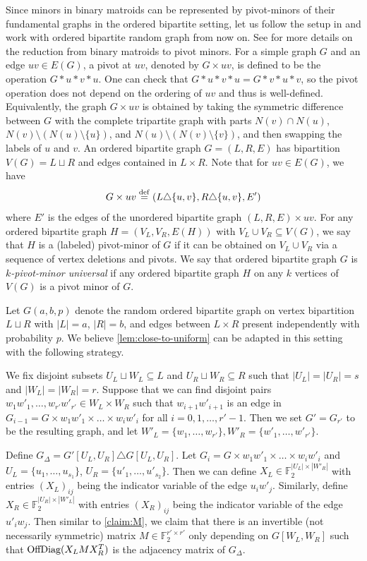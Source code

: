 \documentclass[reqno]{amsart}
\theoremstyle{definition}
\numberwithin{theorem}{section}
\def\eqdef{\overset{\rm{def}}{=}}
\newcommand{\F}{\mathbb{F}}
\newcommand{\OffDiag}{\textup{OffDiag}}
\begin{document}
Since minors in binary matroids can be represented by pivot-minors of their fundamental graphs in the ordered bipartite setting, let us follow the setup in \cite[Section 4]{AFFMP26} and work with ordered bipartite random graph from now on. See \cite{AFFMP26} for more details on the reduction from binary matroids to pivot minors. For a simple graph $G$ and an edge $uv\in E(G)$, a pivot at $uv$, denoted by $G\times uv$, is defined to be the operation $G*u*v*u$. One can check that $G *u*v*u = G*v*u*v$, so the pivot operation does not depend on the ordering of $uv$ and thus is well-defined. Equivalently, the graph $G\times uv$ is obtained by taking the symmetric difference between $G$ with the complete tripartite graph with parts $N(v)\cap N(u)$, $N(v)\setminus (N(u)\setminus \{u\})$, and $N(u)\setminus (N(v)\setminus \{v\})$, and then swapping the labels of $u$ and $v$. An ordered bipartite graph $G = (L, R, E)$ has bipartition $V(G) = L\sqcup R$ and edges contained in $L\times R$. Note that for $uv\in E(G)$, we have 
\[G\times uv \eqdef (L\triangle \{u,v\}, R \triangle \{u,v\}, E') \]
where $E'$ is the edges of the unordered bipartite graph $(L,R,E)\times uv$. For any ordered bipartite graph $H = (V_L,V_R,E(H))$ with $V_L\cup V_R\subseteq V(G)$, we say that $H$ is a (labeled) pivot-minor of $G$ if it can be obtained on $V_L\cup V_R$ via a sequence of vertex deletions and pivots. We say that ordered bipartite graph $G$ is \emph{$k$-pivot-minor universal} if any ordered bipartite graph $H$ on any $k$ vertices of $V(G)$ is a pivot minor of $G$.

Let $G(a, b,p)$ denote the random ordered bipartite graph on vertex bipartition $L\sqcup R$ with $|L| = a$, $|R| = b$, and edges between $L\times R$ present independently with probability $p$. We believe \cref{lem:close-to-uniform} can be adapted in this setting with the following strategy. 

We fix disjoint subsets $U_L\sqcup W_L\subseteq L$ and $U_R\sqcup W_R\subseteq R$ such that $|U_L| = |U_R|=s$ and $|W_L| =|W_R| = r$. 
Suppose that we can find disjoint pairs $w_1w'_1,\dots,w_{r'}w'_{r'}\in W_L\times W_R$ such that $w_{i+1}w'_{i+1}$ is an edge in $G_{i-1}=G\times w_1w'_1\times\dots\times w_{i}w'_{i}$ for all $i=0,1,\dots,r'-1$. Then we set $G'=G_{r'}$ to be the resulting graph, and let $W'_L=\{w_1,\dots,w_{r'}\}, W'_R=\{w'_1,\dots,w'_{r'}\}$.


Define $G_\Delta = G'[U_L,U_R]\triangle G[U_L,U_R]$. Let $G_i = G\times w_1w'_1\times \dots \times w_iw'_i$ and $U_L = \{u_1,\dots, u_{s_1}\}$, $U_R = \{u'_1,\dots, u'_{s_2}\}$. Then we can define $X_L\in \F_2^{|U_L|\times |W'_R|}$ with entries $(X_L)_{ij}$ being the indicator variable of the edge $u_iw'_j$. Similarly, define $X_R\in \F_2^{|U_R|\times |W'_L|}$ with entries $(X_R)_{ij}$ being the indicator variable of the edge $u'_iw_j$. Then similar to \cref{claim:M}, we claim that there is an invertible (not necessarily symmetric) matrix $M\in \F_2^{r'\times r'}$ only depending on $G[W_L,W_R]$ such that $\OffDiag(X_L M X_R^T)$ is the adjacency matrix of $G_\Delta$.
\end{document}
